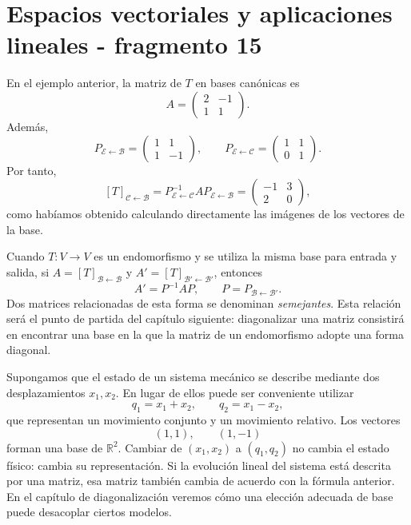 \section{Espacios vectoriales y aplicaciones lineales - fragmento 15}
\begin{example}
En el ejemplo anterior, la matriz de $T$ en bases canónicas es
\[
A=
\begin{pmatrix}
2&-1\\
1&1
\end{pmatrix}.
\]
Además,
\[
P_{\mathcal E\leftarrow\mathcal B}
=
\begin{pmatrix}
1&1\\
1&-1
\end{pmatrix},
\qquad
P_{\mathcal E\leftarrow\mathcal C}
=
\begin{pmatrix}
1&1\\
0&1
\end{pmatrix}.
\]
Por tanto,
\[
[T]_{\mathcal C\leftarrow\mathcal B}
=
P_{\mathcal E\leftarrow\mathcal C}^{-1}
A
P_{\mathcal E\leftarrow\mathcal B}
=
\begin{pmatrix}
-1&3\\
2&0
\end{pmatrix},
\]
como habíamos obtenido calculando directamente las imágenes de los vectores de la base.
\end{example}

Cuando $T:V\to V$ es un endomorfismo y se utiliza la misma base para entrada y salida, si $A=[T]_{\mathcal B\leftarrow\mathcal B}$ y $A'=[T]_{\mathcal B'\leftarrow\mathcal B'}$, entonces
\[
\boxed{
A'=P^{-1}AP,
\qquad
P=P_{\mathcal B\leftarrow\mathcal B'}.
}
\]
Dos matrices relacionadas de esta forma se denominan \emph{semejantes}. Esta relación será el punto de partida del capítulo siguiente: diagonalizar una matriz consistirá en encontrar una base en la que la matriz de un endomorfismo adopte una forma diagonal.

\begin{example}
Supongamos que el estado de un sistema mecánico se describe mediante dos desplazamientos $x_1,x_2$. En lugar de ellos puede ser conveniente utilizar
\[
q_1=x_1+x_2,
\qquad
q_2=x_1-x_2,
\]
que representan un movimiento conjunto y un movimiento relativo. Los vectores
\[
(1,1),\qquad(1,-1)
\]
forman una base de $\mathbb{R}^2$. Cambiar de $(x_1,x_2)$ a $(q_1,q_2)$ no cambia el estado físico: cambia su representación. Si la evolución lineal del sistema está descrita por una matriz, esa matriz también cambia de acuerdo con la fórmula anterior. En el capítulo de diagonalización veremos cómo una elección adecuada de base puede desacoplar ciertos modelos.
\end{example}
